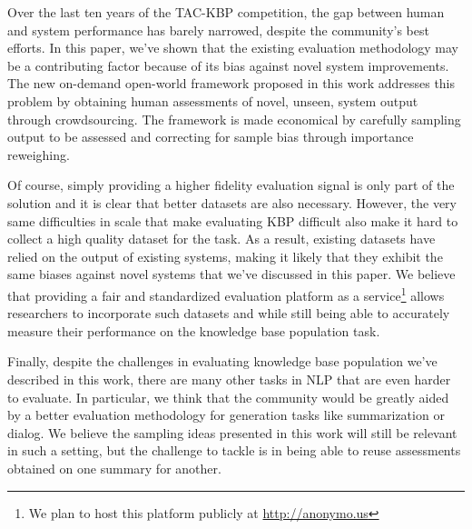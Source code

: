Over the last ten years of the TAC-KBP competition, the gap between human and system performance has barely narrowed, despite the community's best efforts.
In this paper, we've shown that the existing evaluation methodology may be a contributing factor because of its bias against novel system improvements.
The new on-demand open-world framework proposed in this work addresses this problem by obtaining human assessments of novel, unseen, system output through crowdsourcing.
The framework is made economical by carefully sampling output to be assessed and correcting for sample bias through importance reweighing.

Of course, simply providing a higher fidelity evaluation signal is only part of the solution and it is clear that better datasets are also necessary.
However, the very same difficulties in scale that make evaluating KBP difficult also make it hard to collect a high quality dataset for the task.
As a result, existing datasets \citep{angeli2014combining,adel2016comparing} have relied on the output of existing systems, making it likely that they exhibit the same biases against novel systems that we've discussed in this paper.
We believe that providing a fair and standardized evaluation platform as a service\footnote{We plan to host this platform publicly at \url{http://anonymo.us}} 
allows researchers to incorporate such datasets and while still being able to accurately measure their performance on the knowledge base population task.

Finally, despite the challenges in evaluating knowledge base population we've described in this work, there are many other tasks in NLP that are even harder to evaluate.
In particular, we think that the community would be greatly aided by a better evaluation methodology for generation tasks like summarization or dialog.
We believe the sampling ideas presented in this work will still be relevant in such a setting, but the challenge to tackle is in being able to reuse assessments obtained on one summary for another.
